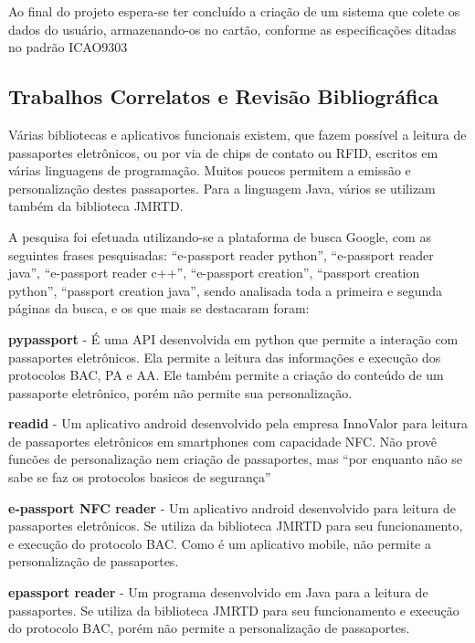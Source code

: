 \documentclass[11pt]{article}
\begin{document}
		    Ao final do projeto espera-se ter concluído a criação de um sistema que colete os dados do usuário, armazenando-os no cartão, conforme as especificações ditadas no padrão ICAO9303


	\subsection{Trabalhos Correlatos e Revisão Bibliográfica}
			
		Várias bibliotecas e aplicativos funcionais existem, que fazem possível a leitura de passaportes eletrônicos, ou por via de chips de contato ou RFID, escritos em várias linguagens de programação. Muitos poucos permitem a emissão e personalização destes passaportes. Para a linguagem Java, vários se utilizam também da biblioteca JMRTD.
		
		A pesquisa foi efetuada utilizando-se a plataforma de busca Google, com as seguintes frases pesquisadas: ``e-passport reader python'', ``e-passport reader java'', ``e-passport reader c++'', ``e-passport creation'', ``passport creation python'', ``passport creation java'', sendo analisada toda a primeira e segunda páginas da busca, e os que mais se destacaram foram:
		
		\textbf{pypassport} - É uma API desenvolvida em python que permite a interação com passaportes eletrônicos. Ela permite a leitura das informações e execução dos protocolos BAC, PA e AA. Ele também permite a criação do conteúdo de um passaporte eletrônico, porém não permite sua personalização\parencite{PYPASSPORT}.
		
		\textbf{readid} - Um aplicativo android desenvolvido pela empresa InnoValor para leitura de passaportes eletrônicos em smartphones com capacidade NFC. Não provê funcões de personalização nem criação de passaportes, mas ``por enquanto não se sabe se faz os protocolos basicos de segurança''\parencite{INNOVALOR}
		
		\textbf{e-passport NFC reader} - Um aplicativo android desenvolvido para leitura de passaportes eletrônicos. Se utiliza da biblioteca JMRTD para seu funcionamento, e execução do protocolo BAC. Como é um aplicativo mobile, não permite a personalização de passaportes.\parencite{TANANAEV}
		
		\textbf{epassport reader} - Um programa desenvolvido em Java para a lei\-tura de passaportes. Se utiliza da biblioteca JMRTD para seu funcionamento e execução do protocolo BAC, porém não permite a personalização de passaportes.\parencite{GLAMDRING}
\end{document}
